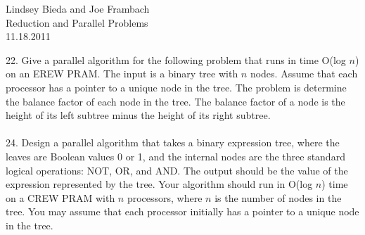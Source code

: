 \documentclass[10pt]{article}
\begin{document}
	\begin{flushright}
	Lindsey Bieda and Joe Frambach\\
	Reduction and Parallel Problems\\
	11.18.2011
	\end{flushright}


22. Give a parallel algorithm for the following problem that runs in time O(log $n$) on an EREW PRAM.
The input is a binary tree with $n$ nodes. Assume that each processor has a pointer to a unique node
in the tree. The problem is determine the balance factor of each node in the tree. The balance factor
of a node is the height of its left subtree minus the height of its right subtree.
\\
\\
24. Design a parallel algorithm that takes a binary expression tree, where the leaves are Boolean values
0 or 1, and the internal nodes are the three standard logical operations: NOT, OR, and AND. The
output should be the value of the expression represented by the tree. Your algorithm should run in
O(log $n$) time on a CREW PRAM with $n$ processors, where $n$ is the number of nodes in the tree. You
may assume that each processor initially has a pointer to a unique node in the tree.
\end{document}
